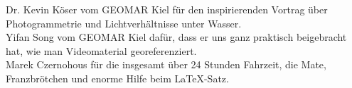 Dr. Kevin Köser vom GEOMAR Kiel für den inspirierenden Vortrag über Photogrammetrie und Lichtverhältnisse unter Wasser.\\



Yifan Song vom GEOMAR Kiel dafür, dass er uns ganz praktisch beigebracht hat, wie man Videomaterial georeferenziert.\\



Marek Czernohous für die insgesamt über 24 Stunden Fahrzeit, die Mate, Franzbrötchen und enorme Hilfe beim \LaTeX -Satz.\\


